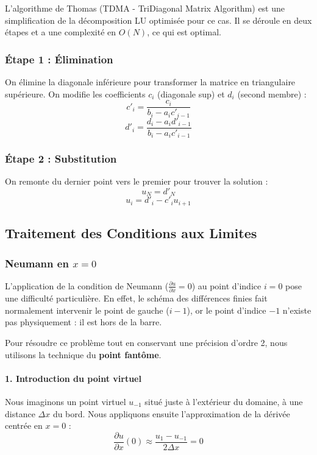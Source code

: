 \documentclass[a4paper,12pt]{article}
\begin{document}
L'algorithme de Thomas (TDMA - TriDiagonal Matrix Algorithm) est une simplification de la décomposition LU optimisée pour ce cas. Il se déroule en deux étapes et a une complexité en $O(N)$, ce qui est optimal.

\subsubsection{Étape 1 : Élimination}
On élimine la diagonale inférieure pour transformer la matrice en triangulaire supérieure. On modifie les coefficients $c_i$ (diagonale sup) et $d_i$ (second membre) :
$$ c'_i = \frac{c_i}{b_i - a_i c'_{i-1}} $$
$$ d'_i = \frac{d_i - a_i d'_{i-1}}{b_i - a_i c'_{i-1}} $$

\subsubsection{Étape 2 : Substitution}
On remonte du dernier point vers le premier pour trouver la solution :
$$ u_N = d'_N $$
$$ u_i = d'_i - c'_i u_{i+1} $$

\subsection{Traitement des Conditions aux Limites}
\subsubsection{Neumann en $x=0$}



L'application de la condition de Neumann ($\frac{\partial u}{\partial x} = 0$) au point d'indice $i=0$ pose une difficulté particulière. En effet, le schéma des différences finies fait normalement intervenir le point de gauche ($i-1$), or le point d'indice $-1$ n'existe pas physiquement : il est hors de la barre.

Pour résoudre ce problème tout en conservant une précision d'ordre 2, nous utilisons la technique du \textbf{point fantôme}.

\paragraph{1. Introduction du point virtuel}
Nous imaginons un point virtuel $u_{-1}$ situé juste à l'extérieur du domaine, à une distance $\Delta x$ du bord. Nous appliquons ensuite l'approximation de la dérivée centrée en $x=0$ :
\begin{equation}
    \frac{\partial u}{\partial x}(0) \approx \frac{u_{1} - u_{-1}}{2\Delta x} = 0
\end{equation}
\end{document}
